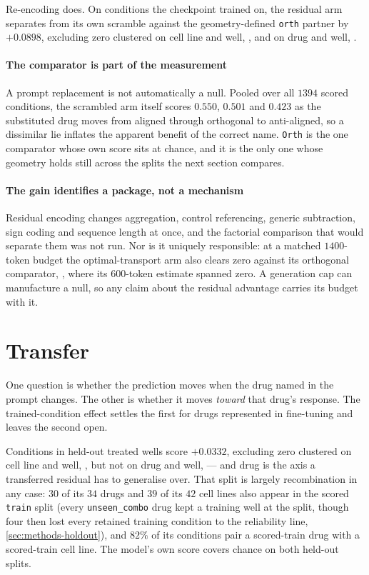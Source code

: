 Re-encoding does. On conditions the checkpoint trained on, the residual arm
separates from its own scramble against the geometry-defined \texttt{orth}
partner by $+0.0898$, excluding zero clustered on cell line and well,
, and on drug and well,
.

\paragraph{The comparator is part of the measurement} A prompt replacement is
not automatically a null. Pooled over all $\num{1394}$ scored conditions, the scrambled arm itself scores $0.550$, $0.501$ and $0.423$ as the substituted drug moves from aligned through orthogonal to
anti-aligned, so a dissimilar lie inflates the apparent benefit of the correct
name. \texttt{Orth} is the one comparator whose own score sits at chance, and it
is the only one whose geometry holds still across the splits the next section
compares.

\paragraph{The gain identifies a package, not a mechanism} Residual encoding
changes aggregation, control referencing, generic subtraction, sign coding and
sequence length at once, and the factorial comparison that would separate them
was not run. Nor is it uniquely responsible: at a matched $1400$-token budget the
optimal-transport arm also clears zero against its orthogonal comparator,
, where its $600$-token estimate spanned zero. A
generation cap can manufacture a null, so any claim about the residual advantage
carries its budget with it.

\section{Transfer}

One question is whether the prediction moves when the drug named in the prompt
changes. The other is whether it moves \emph{toward} that drug's response. The
trained-condition effect settles the first for drugs represented in fine-tuning
and leaves the second open.

Conditions in held-out treated wells score $+0.0332$, excluding zero clustered on
cell line and well, , but not on drug and well,
 --- and drug is the axis a transferred residual
has to generalise over. That split is largely recombination in any case: $30$ of its $34$ drugs and $39$ of its $42$ cell lines also appear in the scored \texttt{train} split (every \texttt{unseen\_combo} drug kept a training well at the split, though four then lost every retained training condition to the reliability line, \cref{sec:methods-holdout}), and $82\%$ of its conditions pair a scored-train drug with a scored-train cell line. The model's own
score covers chance on both held-out splits.

